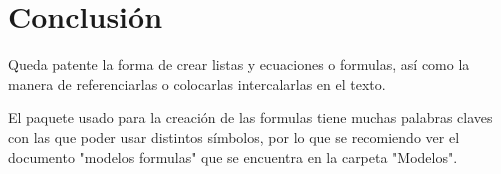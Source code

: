 \section{Conclusión}

Queda patente la forma de crear listas y ecuaciones o formulas, así como la manera de referenciarlas o colocarlas intercalarlas en el texto.

El paquete usado para la creación de las formulas tiene muchas palabras claves con las que poder usar distintos símbolos, por lo que se recomiendo ver el documento "modelos formulas" que se encuentra en la carpeta "Modelos".